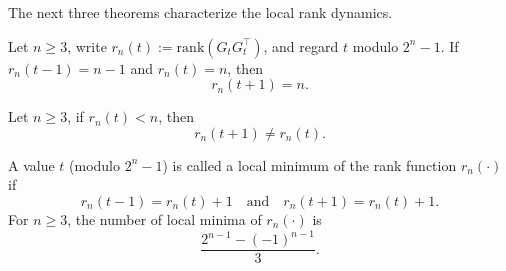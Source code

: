\documentclass[hidelinks,onefignum,onetabnum]{siamart251216}
\theoremstyle{definition}
\theoremstyle{remark}
\providecommand{\rank}{{\mathrm{rank}}}
\begin{document}
The next three theorems characterize the local rank dynamics.

\begin{theorem}\label{thm Persistence}
Let $n\ge 3$, write $r_n(t):=\rank(G_tG_t^\top)$, and regard $t$ modulo $2^n-1$. If $r_n(t-1)=n-1$ and $r_n(t)=n$, then $$r_n(t+1)=n.$$
	
\end{theorem}

\begin{theorem}\label{thm Insta}
Let $n\ge 3$, if $r_n(t)<n$, then $$r_n(t+1)\ne r_n(t).$$
	
\end{theorem}

\begin{theorem}\label{thm Enumeration of local minima}
	A value $t$ (modulo $2^n-1$) is called a local minimum of the rank function $r_n(\cdot)$ if 
	\[
	r_n(t-1)=r_n(t)+1
	\quad\text{and}\quad
	r_n(t+1)=r_n(t)+1.
	\]
For $n\ge 3$, the number of local minima of $r_n(\cdot)$ is
	\[
	\frac{2^{n-1}-(-1)^{n-1}}{3}.
	\]
\end{theorem}

\end{document}

